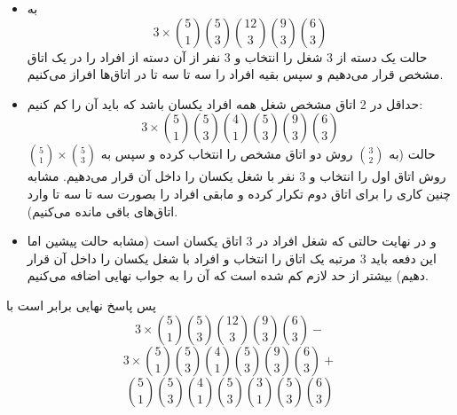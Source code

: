 \p
\begin{itemize}
    \item 
    به
    $$3\times\binom{5}{1}\binom{5}{3}\binom{12}{3}\binom{9}{3}\binom{6}{3}$$
    حالت یک دسته از 3 شغل را انتخاب و 3 نفر از آن دسته از افراد را در یک اتاق مشخص قرار می‌دهیم و سپس بقیه افراد را سه تا سه تا در اتاق‌ها افراز می‌کنیم.

    \item 
    حداقل در 2 اتاق مشخص شغل همه افراد یکسان باشد که باید آن را کم کنیم: 
    $$3\times\binom{5}{1}\binom{5}{3}\binom{4}{1}\binom{5}{3}\binom{9}{3}\binom{6}{3}$$
    حالت  (به
    $\binom{3}{2}$
    روش دو اتاق مشخص را انتخاب کرده و سپس به 
    $\binom{5}{1}\times\binom{5}{3}$
    روش اتاق اول را انتخاب و 3 نفر با شغل یکسان را داخل آن قرار می‌دهیم. مشابه چنین کاری را برای اتاق دوم تکرار کرده و مابقی افراد را بصورت سه تا سه تا وارد اتاق‌های باقی مانده می‌کنیم).

    \item 
    و در نهایت حالتی که شغل افراد در 3 اتاق یکسان است (مشابه حالت پیشین اما این دفعه باید 3 مرتبه یک اتاق را انتخاب و افراد با شغل یکسان را داخل آن قرار دهیم) بیشتر از حد لازم کم شده است که آن را به جواب نهایی اضافه می‌کنیم.
\end{itemize} 
    پس پاسخ نهایی برابر است با
    $$3\times\binom{5}{1}\binom{5}{3}\binom{12}{3}\binom{9}{3}\binom{6}{3}-$$
    $$3\times\binom{5}{1}\binom{5}{3}\binom{4}{1}\binom{5}{3}\binom{9}{3}\binom{6}{3}+$$
    $$\binom{5}{1}\binom{5}{3}\binom{4}{1}\binom{5}{3}\binom{3}{1}\binom{5}{3}\binom{6}{3}$$
